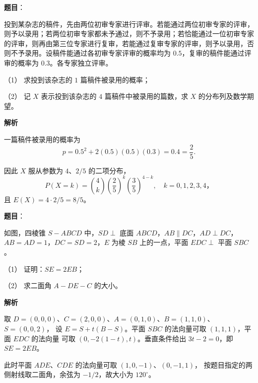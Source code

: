 \begin{answer}

\textbf{题目}：

投到某杂志的稿件，先由两位初审专家进行评审。若能通过两位初审专家的评审，则予以录用；若两位初审专家都未予通过，则不予录用；若恰能通过一位初审专家的评审，则再由第三位专家进行复审，若能通过复审专家的评审，则予以录用，否则不予录用。设稿件能通过各初审专家评审的概率均为 $0.5$，复审的稿件能通过评审的概率为 $0.3$。各专家独立评审。

（1） 求投到该杂志的 $1$ 篇稿件被录用的概率；

（2） 记 $X$ 表示投到该杂志的 $4$ 篇稿件中被录用的篇数，求 $X$ 的分布列及数学期望。

\textbf{解析}


一篇稿件被录用的概率为
\nopagebreak[4]
\[
p=0.5^2+2(0.5)(0.5)(0.3)=0.4=\frac25.
\]


因此 $X$ 服从参数为 $4\text{、}2/5$ 的二项分布，
\nopagebreak[4]
\[
P(X=k)=\binom4k\left(\frac25\right)^k\left(\frac35\right)^{4-k},\quad k=0,1,2,3,4\text{，}
\]
且 $E(X)=4\cdot2/5=8/5$。



\end{answer}
\begin{answer}

\textbf{题目}：

如图，四棱锥 $S-ABCD$ 中，$SD\perp$ 底面 $ABCD$，$AB\parallel DC$，$AD\perp DC$，$AB=AD=1$，$DC=SD=2$，$E$ 为棱 $SB$ 上的一点，平面 $EDC\perp$ 平面 $SBC$。
\nopagebreak[4]
\begin{center}\end{center}
\nopagebreak[4]
（1） 证明：$SE=2EB$；

（2） 求二面角 $A-DE-C$ 的大小。

\textbf{解析}


取 $D=(0,0,0)$、$C=(2,0,0)$、$A=(0,1,0)$、$B=(1,1,0)$、$S=(0,0,2)$，
设 $E=S+t(B-S)$。平面 $SBC$ 的法向量可取 $(1,1,1)$，平面 $EDC$ 的法向量
可取 $(0,-2(1-t),t)$。垂直条件给出 $3t-2=0$，即 $SE=2EB$。


此时平面 $ADE\text{、}CDE$ 的法向量可取 $(1,0,-1)$、$(0,-1,1)$，
按题目指定的两侧射线取二面角，余弦为 $-1/2$，故大小为 $120^\circ$。



\end{answer}

